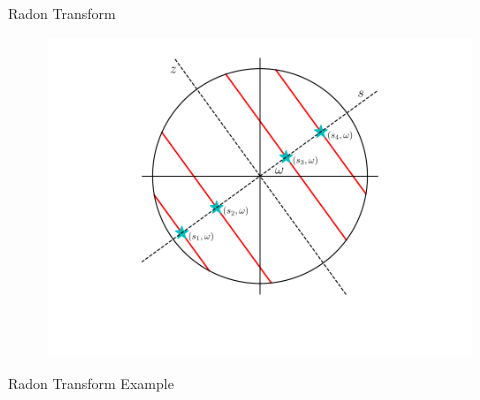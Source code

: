 \documentclass{beamer}
\begin{document}
\begin{frame}{Radon Transform}
	\begin{figure}[H]
		\centering
		\includegraphics[scale=0.65]{figures/AllRadon.pdf}
	\end{figure}
\end{frame}

\begin{frame}{Radon Transform Example}
    \hspace{-0.1\linewidth}
    \begin{minipage}[r]{0.5\linewidth}
        \begin{figure}[r]
            \centering
        \end{figure}    
    \end{minipage}
    \hspace{0.3cm}
    \begin{minipage}[c]{0.1\linewidth}
        \begin{figure}[c]
            \centering
        \end{figure}
    \end{minipage}
\end{frame}
\end{document}
